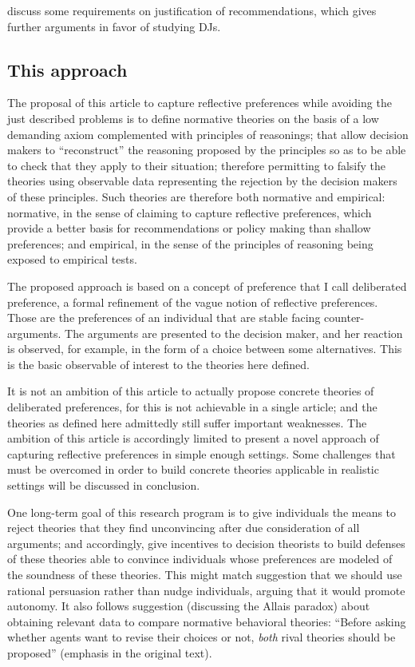 \documentclass[version=last, pagesize, twoside=off, bibliography=totoc, DIV=calc, fontsize=12pt, a4paper, french, english]{scrartcl}
\begin{document}
 discuss some requirements on justification of recommendations, which gives further arguments in favor of studying \acp{DJ}.

\subsection{This approach}
The proposal of this article to capture reflective preferences while avoiding the just described problems is to define normative theories on the basis of a low demanding axiom complemented with principles of reasonings; that allow decision makers to “reconstruct” the reasoning proposed by the principles so as to be able to check that they apply to their situation; therefore permitting to falsify the theories using observable data representing the rejection by the decision makers of these principles. Such theories are therefore both normative and empirical: normative, in the sense of claiming to capture reflective preferences, which provide a better basis for recommendations or policy making than shallow preferences; and empirical, in the sense of the principles of reasoning being exposed to empirical tests.

The proposed approach is based on a concept of preference that I call deliberated preference, a formal refinement of the vague notion of reflective preferences. Those are the preferences of an individual that are stable facing counter-arguments. The arguments are presented to the decision maker, and her reaction is observed, for example, in the form of a choice between some alternatives. This is the basic observable of interest to the theories here defined.

It is not an ambition of this article to actually propose concrete theories of deliberated preferences, for this is not achievable in a single article; and the theories as defined here admittedly still suffer important weaknesses. The ambition of this article is accordingly limited to present a novel approach of capturing reflective preferences in simple enough settings.
Some challenges that must be overcomed in order to build concrete theories applicable in realistic settings will be discussed in conclusion.

One long-term goal of this research program is to give individuals the means to reject theories that they find unconvincing after due consideration of all arguments; and accordingly, give incentives to decision theorists to build defenses of these theories able to convince individuals whose preferences are modeled of the soundness of these theories. This might match  suggestion that we should use rational persuasion rather than nudge individuals, arguing that it would promote autonomy.
It also follows  suggestion (discussing the Allais paradox) about obtaining relevant data to compare normative behavioral theories: “Before asking whether agents want to revise their choices or not, \emph{both} rival theories should be proposed” (emphasis in the original text).
\end{document}
